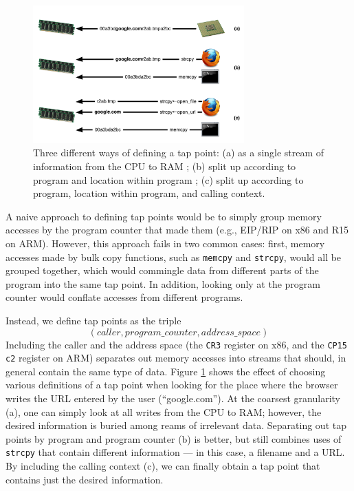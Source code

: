 \begin{figure}[t]
\begin{center}
\includegraphics[width=3.2in]{tappoint.pdf}
\end{center}
\caption{Three different ways of defining a tap point: (a) as a single
stream of information from the CPU to RAM ; (b) split up according to
program and location within program ; (c) split up according to program,
location within program, and calling context.}
\label{fig:tappoint}
\end{figure}

A naive approach to defining tap points would be to simply group memory
accesses by the program counter that made them (e.g., EIP/RIP on x86 and
R15 on ARM). However, this approach fails in two common cases: first,
memory accesses made by bulk copy functions, such as \texttt{memcpy} and
\texttt{strcpy}, would all be grouped together, which would commingle
data from different parts of the program into the same tap point. In
addition, looking only at the program counter would conflate accesses
from different programs.

Instead, we define tap points as the triple \[ (caller,
program\_counter, address\_space) \] Including the caller and the
address space (the \texttt{CR3} register on x86, and the \texttt{CP15
c2} register on ARM) separates out memory accesses into streams that
should, in general contain the same type of data. Figure
\ref{fig:tappoint} shows the effect of choosing various definitions of a
tap point when looking for the place where the browser writes the URL
entered by the user (``google.com''). At the coarsest granularity (a),
one can simply look at all writes from the CPU to RAM; however, the
desired information is buried among reams of irrelevant data.
Separating out tap points by program and program counter (b) is better,
but still combines uses of \texttt{strcpy} that contain different
information --- in this case, a filename and a URL. By including the
calling context (c), we can finally obtain a tap point that contains
just the desired information.

